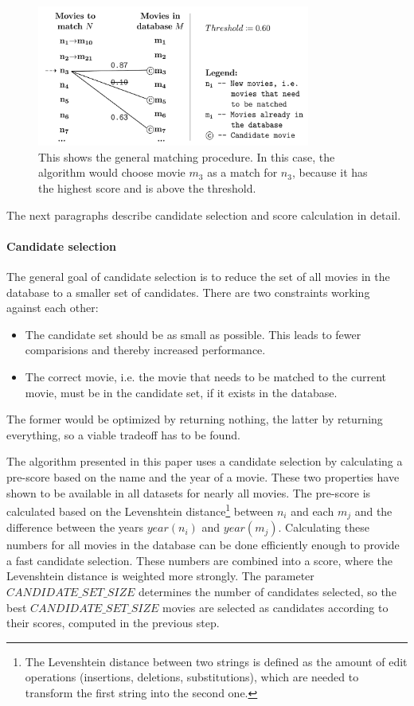 \begin{figure}[ht]
  \begin{center}
  \includegraphics[width=0.8\textwidth]{images/matching_general.pdf}
  \end{center}
  \caption{This shows the general matching procedure. In this case, the algorithm would choose movie $m_3$ as a match for $n_3$, because it has the highest score and is above the threshold.}
  \label{fig_matching_general}
\end{figure}

The next paragraphs describe candidate selection and score calculation in detail.

\paragraph{Candidate selection}

The general goal of candidate selection is to reduce the set of all movies in the database to a smaller set of candidates.
There are two constraints working against each other:
\begin{itemize}
	\item The candidate set should be as small as possible. This leads to fewer comparisions and thereby increased performance.
	\item The correct movie, i.e. the movie that needs to be matched to the current movie, must be in the candidate set, if it exists in the database.
\end{itemize}
The former would be optimized by returning nothing, the latter by returning everything, so a viable tradeoff has to be found.

The algorithm presented in this paper uses a candidate selection by calculating a pre-score based on the name and the year of a movie.
These two properties have shown to be available in all datasets for nearly all movies.
The pre-score is calculated based on the Levenshtein distance\footnote{The Levenshtein distance between two strings is defined as the amount of edit operations (insertions, deletions, substitutions), which are needed to transform the first string into the second one.} between $n_i$ and each $m_j$ and the difference between the years $year(n_i)$ and $year(m_j)$.
Calculating these numbers for all movies in the database can be done efficiently enough to provide a fast candidate selection.
These numbers are combined into a score, where the Levenshtein distance is weighted more strongly.
The parameter $CANDIDATE\_SET\_SIZE$ determines the number of candidates selected, so the best $CANDIDATE\_SET\_SIZE$ movies are selected as candidates according to their scores, computed in the previous step.

